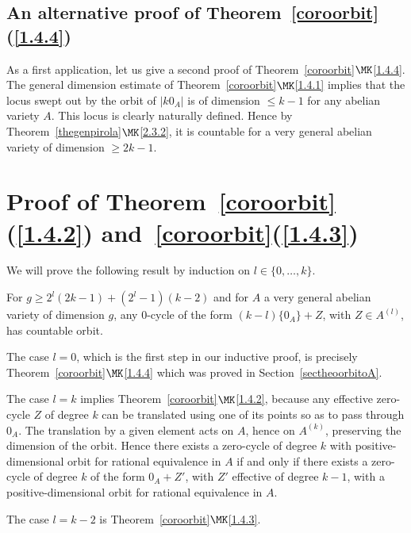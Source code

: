 \subsection{An alternative proof of Theorem~\ref{coroorbit}\tMK(\ref{1.4.4})}

As a first application, let us give a second proof of Theorem~\ref{coroorbit}$\MK$\eqref{1.4.4}. The general dimension estimate of Theorem~\ref{coroorbit}$\MK$\eqref{1.4.1} implies that the locus swept out by the orbit of $|k0_A|$ is of dimension $\leq k-1$ for any abelian variety $A$. This locus is clearly naturally defined. Hence by Theorem~\ref{thegenpirola}$\MK$\eqref{2.3.2}, it is countable for a very general abelian variety of dimension $\geq 2k-1$.


\section{Proof of Theorem~\ref{coroorbit}\tMK(\ref{1.4.2}) and~\ref{coroorbit}\tMK(\ref{1.4.3})}

We will prove the following result by induction on $l\in\{0,\dots,k\}$.

\begin{prop}\label{proinduction}
For $g\geq 2^{l}(2k-1)+(2^{l}-1)(k-2)$ and for $A$ a very general abelian variety
of dimension $g$, any $0$-cycle of the form $(k-l)\{0_A\}+Z$, with $Z\in A^{(l)}$, has countable orbit.
\end{prop}

The case $l=0$, which is the first step in our inductive proof, is precisely Theorem~\ref{coroorbit}$\MK$\eqref{1.4.4} which was proved in Section~\ref{sectheoorbitoA}.

The case $l=k$ implies Theorem~\ref{coroorbit}$\MK$\eqref{1.4.2}, because any effective zero-cycle $Z$ of degree $k$ can be translated using one of its points so as to pass through $0_A$. The translation by a given element acts on $A$, hence on $A^{(k)}$, preserving the dimension of the orbit. Hence there exists a zero-cycle of degree $k$ with positive-dimensional orbit for rational equivalence in $A$ if and only if there exists a zero-cycle of degree $k$ of the form $0_A+Z'$, with $Z'$ effective of degree $k-1$, with a positive-dimensional orbit for rational equivalence in $A$.

The case $l=k-2$ is Theorem~\ref{coroorbit}$\MK$\eqref{1.4.3}.

